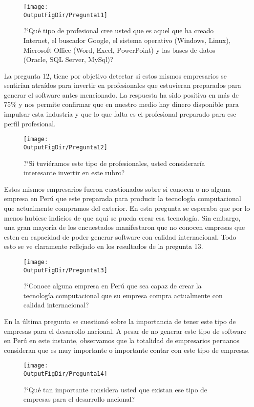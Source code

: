 \begin{figure}[!h]
	\centering
	\texttt{[image: \\OutputFigDir/Pregunta11]}
	\label{fig:Preg11}
	\caption{?`Qué tipo de profesional cree usted que es aquel que ha creado Internet, el buscador Google, el sistema operativo (Windows, Linux), Microsoft Office (Word, Excel, PowerPoint) y las bases de datos (Oracle, SQL Server, MySql)?}
\end{figure}

La pregunta 12, tiene por objetivo detectar si estos mismos empresarios se sentirían atraídos para invertir en profesionales que estuvieran preparados para generar el software antes mencionado. La respuesta ha sido positiva en más de 75\% y nos permite confirmar que en nuestro medio hay dinero disponible para impulsar esta industria y que lo que falta es el profesional preparado para ese perfil profesional.

\begin{figure}[!h]
	\centering
	\texttt{[image: \\OutputFigDir/Pregunta12]}
	\label{fig:Preg12}
	\caption{?`Si tuviéramos este tipo de profesionales, usted consideraría interesante invertir en este rubro?}
\end{figure}

Estos mismos empresarios fueron cuestionados sobre si conocen o no alguna empresa en Perú que este preparada para producir la tecnología computacional que actualmente compramos del exterior. En esta pregunta se esperaba que por lo menos hubiese indicios de que aquí se pueda crear esa tecnología. Sin embargo, una gran mayoría de los encuestados manifestaron que no conocen empresas que esten en capacidad de poder generar software con calidad internacional. Todo esto se ve claramente reflejado en los resultados de la pregunta 13.

\begin{figure}[!h]
	\centering
	\texttt{[image: \\OutputFigDir/Pregunta13]}
	\label{fig:Preg13}
	\caption{?`Conoce alguna empresa en Perú que sea capaz de crear la tecnología computacional que su empresa compra actualmente con calidad internacional?}
\end{figure}

En la última pregunta se cuestionó sobre la importancia de tener este tipo de empresas para el desarrollo nacional. A pesar de no generar este tipo de software en Perú en este instante, observamos que la totalidad de empresarios peruanos consideran que es muy importante o importante contar con este tipo de empresas.

\begin{figure}[!h]
	\centering
	\texttt{[image: \\OutputFigDir/Pregunta14]}
	\label{fig:Preg14}
	\caption{?`Qué tan importante considera usted que existan ese tipo de empresas para el desarrollo nacional?}
\end{figure}


